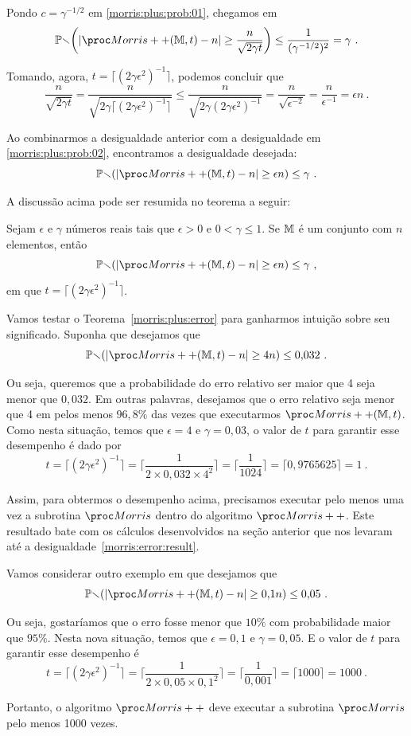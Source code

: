 Pondo $c = \gamma^{-1/2}$ em \eqref{morris:plus:prob:01}, chegamos em
\begin{align}
  \Pbb\bigg(|\Morrispp(\Mbb,t)-n| \geq \frac{n}{\sqrt{2\gamma t}}\bigg) \leq \frac{1}{(\gamma^{-1/2})^2} = \gamma \ . 
  \label{morris:plus:prob:02}
\end{align}

Tomando, agora, $t =\lceil (2\gamma\epsilon^2)^{-1} \rceil$, podemos concluir que
\[ \frac{n}{\sqrt{2\gamma t}} = \frac{n}{\sqrt{2\gamma \lceil (2\gamma\epsilon^2)^{-1} \rceil}} \leq 
\frac{n}{\sqrt{2\gamma(2\gamma\epsilon^2)^{-1}}} = \frac{n}{\sqrt{\epsilon^{-2}}} = \frac{n}{\epsilon^{-1}} = 
\epsilon n \ . \] 

Ao combinarmos a desigualdade anterior com a desigualdade em \eqref{morris:plus:prob:02}, encontramos a desigualdade
desejada:
\[ \Pbb(|\Morrispp(\Mbb,t)-n| \geq \epsilon n) \leq \gamma \ . \]

A discussão acima pode ser resumida no teorema a seguir:
\begin{theorem}
  \label{morris:plus:error}
  Sejam $\epsilon$ e $\gamma$ números reais tais que $\epsilon > 0$ e $0 < \gamma \leq 1$. Se $\mathbb{M}$ é um conjunto com 
  $n$ elementos, então
  \[ \Pbb(|\Morrispp(\Mbb,t)-n| \geq \epsilon n) \leq \gamma \ , \]
  em que $t =\lceil (2\gamma\epsilon^2)^{-1} \rceil$.
\end{theorem}

Vamos testar o Teorema~\eqref{morris:plus:error} para ganharmos intuição sobre seu significado. Suponha que desejamos
que
\[ \Pbb(|\Morrispp(\Mbb, t) - n| \geq 4n) \leq 0{,}032 \ . \]

Ou seja, queremos que a probabilidade do erro relativo ser maior que 4 seja menor que $0{,}032$. Em outras palavras, 
desejamos que o erro relativo seja menor que 4 em pelos menos $96{,}8\%$ das vezes que executarmos $\Morrispp(\Mbb, t)$.
Como nesta situação, temos que $\epsilon = 4$ e $\gamma = 0{,}03$, o valor de $t$ para garantir esse desempenho é dado 
por
\[ t = \lceil (2\gamma\epsilon^2)^{-1}\rceil = \bigg\lceil \frac{1}{2 \times 0{,}032 \times 4^2}\bigg\rceil = 
\bigg\lceil \frac{1}{1024} \bigg\rceil = \lceil 0{,}9765625 \rceil = 1 \ . \]

Assim, para obtermos o desempenho acima, precisamos executar pelo menos uma vez a subrotina $\Morris$ dentro do 
algoritmo $\Morrispp$. Este resultado bate com os cálculos desenvolvidos na seção anterior que nos levaram até a 
desigualdade~\eqref{morris:error:result}.

Vamos considerar outro exemplo em que desejamos que
\[ \Pbb(|\Morrispp(\Mbb, t) - n| \geq 0{,}1n) \leq 0{,}05 \ . \]

Ou seja, gostaríamos que o erro fosse menor que $10\%$ com probabilidade maior que $95\%$. Nesta nova situação, temos 
que $\epsilon = 0{,}1$ e $\gamma = 0{,}05$. E o valor de $t$ para garantir esse desempenho é
\[ t = \lceil (2\gamma\epsilon^2)^{-1}\rceil = \bigg\lceil \frac{1}{2 \times 0{,}05 \times 0,1^2}\bigg\rceil = 
\bigg\lceil \frac{1}{0{,}001} \bigg\rceil = \lceil 1000 \rceil = 1000 \ . \]

Portanto, o algoritmo $\Morrispp$ deve executar a subrotina $\Morris$ pelo menos 1000 vezes.